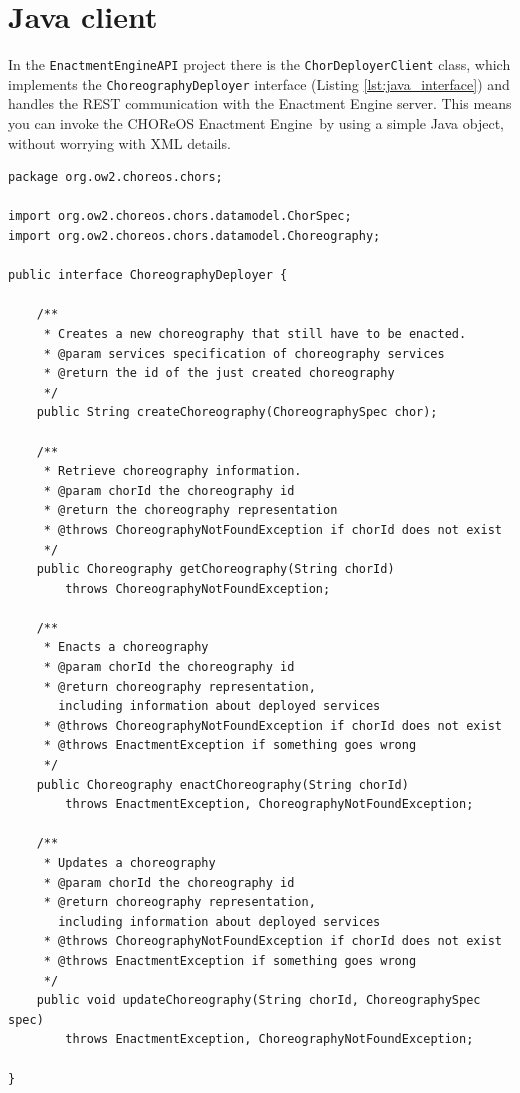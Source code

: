 \documentclass[a4paper, 10pt]{article}
\newcommand{\ee}{CHOReOS Enactment Engine}
\begin{document}
\section{Java client}
\label{sec:client}

In the \verb!EnactmentEngineAPI! project there is the \verb!ChorDeployerClient! class, which implements the \verb!ChoreographyDeployer! interface (Listing \ref{lst:java_interface}) and handles the REST communication with the Enactment Engine server. This means you can invoke the \ee\ by using a simple Java object, without worrying with XML details.

{\small
\lstset{language=Java}
\begin{lstlisting}[caption=\ee\ Java interface, label=lst:java_interface]
package org.ow2.choreos.chors;

import org.ow2.choreos.chors.datamodel.ChorSpec;
import org.ow2.choreos.chors.datamodel.Choreography;

public interface ChoreographyDeployer {
	
	/**
	 * Creates a new choreography that still have to be enacted.
	 * @param services specification of choreography services
	 * @return the id of the just created choreography
	 */
	public String createChoreography(ChoreographySpec chor);
	
	/**
	 * Retrieve choreography information.
	 * @param chorId the choreography id
	 * @return the choreography representation
	 * @throws ChoreographyNotFoundException if chorId does not exist 
	 */
	public Choreography getChoreography(String chorId) 
		throws ChoreographyNotFoundException;

	/**
	 * Enacts a choreography
	 * @param chorId the choreography id
	 * @return choreography representation, 
	   including information about deployed services 
	 * @throws ChoreographyNotFoundException if chorId does not exist 
	 * @throws EnactmentException if something goes wrong 
	 */
	public Choreography enactChoreography(String chorId) 
		throws EnactmentException, ChoreographyNotFoundException;

	/**
	 * Updates a choreography
	 * @param chorId the choreography id
	 * @return choreography representation, 
	   including information about deployed services 
	 * @throws ChoreographyNotFoundException if chorId does not exist 
	 * @throws EnactmentException if something goes wrong
	 */
	public void updateChoreography(String chorId, ChoreographySpec spec) 
		throws EnactmentException, ChoreographyNotFoundException;
	
}
\end{lstlisting}
}
\end{document}
